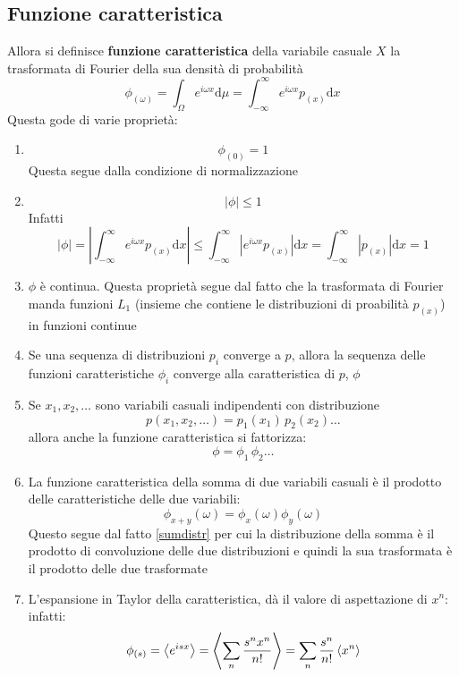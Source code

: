 \documentclass[a4paper,12pt]{article}
\renewcommand{\arg}[1]{_{(#1)}}
\theoremstyle{plain}
\theoremstyle{definition}
\newcommand{\f}[2]{\frac{#1}{#2}}
\renewcommand{\d}{\text{d}}
\theoremstyle{remark}
\begin{document}
\subsection{Funzione caratteristica}
Allora si definisce \textbf{funzione caratteristica} della variabile casuale $X$ la trasformata di Fourier della sua densità di probabilità
\[\phi\arg{\omega}=\int_\Omega e^{i\omega x}\d \mu=\int_{-\infty}^{\infty} e^{i\omega x}p\arg{x}\d x	\]
Questa gode di varie proprietà:
\begin{enumerate}
	\item \[\phi\arg{0}=1\]
	Questa segue dalla condizione di normalizzazione
	\item \[|\phi|\le1\]
	Infatti
	\[|\phi|=\left|\int_{-\infty}^{\infty} e^{i\omega x}p\arg{x}\d x\right| \le	\int_{-\infty}^{\infty}\left| e^{i\omega x}p\arg{x}\right|\d x=\int_{-\infty}^{\infty}|p\arg{x}|\d x=1	\]
	\item $\phi$ è continua. Questa proprietà segue dal fatto che la trasformata di Fourier manda funzioni $L_1$ (insieme che contiene le distribuzioni di proabilità $p\arg{x}$) in funzioni continue
	\item Se una sequenza di distribuzioni $p_i$ converge a $p$, allora la sequenza delle funzioni caratteristiche $\phi_i$ converge alla caratteristica di $p$, $\phi$
	\item Se $x_1,x_2,\ldots$ sono variabili casuali indipendenti con distribuzione \[p({x_1,x_2,\ldots})=p_1({x_1})\,p_2({x_2})\ldots\] 
	allora anche la funzione caratteristica si fattorizza:
	\[\phi=\phi_1\,\phi_2\ldots\]
	\item La funzione caratteristica della somma di due variabili casuali è il prodotto delle caratteristiche delle due variabili:
	\[\phi_{x+y}(\omega)=\phi_{x}(\omega)\phi_{y}(\omega)		\]
	Questo segue dal fatto \ref{sumdistr} per cui la distribuzione della somma è il prodotto di convoluzione delle due distribuzioni e quindi la sua trasformata è il prodotto delle due trasformate
\item L'espansione in Taylor della caratteristica, dà il valore di aspettazione di $x^n$: infatti:
\[\phi\arg{s}=\expval{e^{is x}}=\expval{\sum_n\f{s^n x^n}{n!}}=\sum_n\f{s^n}{n!}\expval{{ x^n}{}}\]

\end{enumerate}
\end{document}
